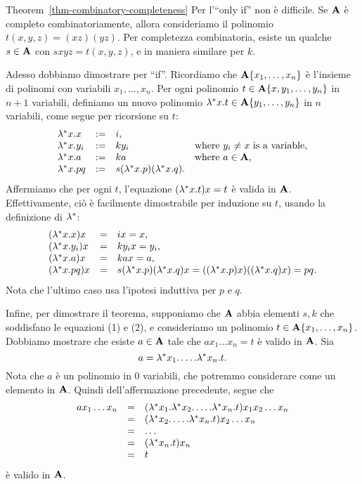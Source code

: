 \documentclass{article}
\begin{document}
\begin{proofof}{Theorem~\ref{thm-combinatory-completeness}}
  Per l'``only if'' non \`e difficile. Se ${\bf A}$ \`e completo
  combinatoriamente, allora consideriamo il polinomio $t(x,y,z)=(xz)(yz)$. Per
  completezza combinatoria, esiste un qualche $s\in{\bf A}$ con
  $sxyz=t(x,y,z)$, e in maniera similare per $k$.
  
  Adesso dobbiamo dimostrare per ``if''.  Ricordiamo che
  ${\bf A}\{x_1,\ldots,x_n\}$ \`e l'insieme di polinomi con variabili
  $x_1,\ldots,x_n$. Per ogni polinomio $t\in{\bf A}\{x,y_1,\ldots,y_n\}$ in
  $n+1$ variabili, definiamo un nuovo polinomio $\lambda^*x.t \in
  {\bf A}\{y_1,\ldots,y_n\}$ in $n$ variabili, come segue per ricorsione su
  $t$:
  \[ \begin{array}{llll}
    \lambda^*x.x &:=& i,\\
    \lambda^*x.y_i &:=& ky_i & \mbox{where $y_i\neq x$ is a variable,} \\
    \lambda^*x.a &:=& ka     & \mbox{where $a\in {\bf A}$,}\\
    \lambda^*x.pq &:=& s(\lambda^*x.p)(\lambda^*x.q). \\
  \end{array}
  \]
  Affermiamo che per ogni $t$, l'equazione $(\lambda^* x.t)x = t$ \`e valida
  in ${\bf A}$. Effettivamente, ci\`o \`e facilmente dimostrabile per induzione su $t$, 
  usando la definizione di $\lambda^*$:
  \[ \begin{array}{llll}
    (\lambda^*x.x)x &=& ix = x,\\
    (\lambda^*x.y_i)x &=& ky_ix = y_i,\\
    (\lambda^*x.a)x &=& kax = a,\\
    (\lambda^*x.pq)x &=& s(\lambda^*x.p)(\lambda^*x.q)x = ((\lambda^*x.p)x)((\lambda^*x.q)x) = pq. \\
  \end{array}
  \]
  Nota che l'ultimo caso usa l'ipotesi induttiva per $p$ e $q$.
  
  Infine, per dimostrare il teorema, supponiamo che ${\bf A}$ abbia elementi $s,k$
  che soddisfano le equazioni (1) e (2), e consideriamo un polinomio
  $t\in{\bf A}\{x_1,\ldots,x_n\}$. Dobbiamo mostrare che esiste $a\in{\bf A}$
  tale che $ax_1\ldots x_n = t$ \`e valido in ${\bf A}$. Sia
  \[ a = \lambda^*x_1.\ldots.\lambda^*x_n.t.
  \]
  Nota che $a$ \`e un polinomio in $0$ variabili, che potremmo
  considerare come un elemento in ${\bf A}$. Quindi dell'affermazione precedente,
  segue che
  \[ \begin{array}{lll}
    ax_1\ldots x_n &=& (\lambda^*x_1.\lambda^*x_2.\ldots.\lambda^*x_n.t)x_1x_2\ldots x_n\\
    &=& (\lambda^*x_2.\ldots.\lambda^*x_n.t)x_2\ldots x_n\\
    &=& \ldots\\
    &=& (\lambda^*x_n.t)x_n\\
    &=& t\\
  \end{array}
  \]
  \`e valido in ${\bf A}$. \eot
\end{proofof}
\end{document}
